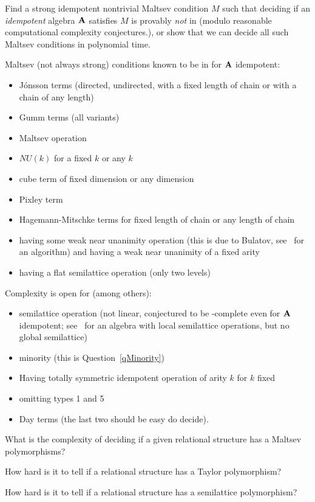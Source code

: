 \begin{question}
  Find a strong idempotent nontrivial Maltsev condition $M$ such that deciding
  if an \emph{idempotent} algebra ${\mathbf{A}}$ satisfies $M$ is provably \emph{not}
  in \compP{} (modulo reasonable computational complexity conjectures.), or show
  that we can decide all such Maltsev conditions in polynomial time. 
\end{question}
\begin{context}
  Maltsev (not always strong) conditions known to be in \compP{} for ${\mathbf{A}}$
  idempotent:
  \begin{itemize}
    \item  Jónsson terms (directed, undirected, with a fixed length of chain
  or with a chain of any length)
     \item Gumm terms (all variants)
     \item Maltsev operation
     \item $NU(k)$ for a fixed $k$ or any $k$
     \item cube term of fixed dimension or any
  dimension
      \item Pixley term
      \item Hagemann-Mitschke terms for fixed length of chain or any length of
	chain
      \item having some weak near
	unanimity operation (this is due to Bulatov,
	see~\cite[Theorem 6.3]{freese-valeriote-complexity} for an algorithm) 
  and having a weak near unanimity of a fixed arity
      \item having a flat semilattice operation (only two levels)
  \end{itemize}

  Complexity is open for (among others):
  \begin{itemize}
    \item semilattice operation (not linear, conjectured to be
      \compEXPTIME-complete even for ${\mathbf{A}}$ idempotent;
      see~\cite{} for an
      algebra with local semilattice operations, but no global semilattice)
    \item minority (this is Question~\ref{qMinority})
    \item Having totally symmetric idempotent operation of arity $k$ for $k$
      fixed
    \item omitting types 1 and 5
    \item Day terms  (the last two should be easy do decide).
  \end{itemize}
\end{context}
\begin{question}
  What is the complexity of deciding if a given relational structure has a
  Maltsev polymorphisms?
\end{question}
\begin{question}
  How hard is it to tell if a relational structure has a Taylor polymorphism?
\end{question}
\begin{question}
  How hard is it to tell if a relational structure has a semilattice
  polymorphism?
\end{question}
